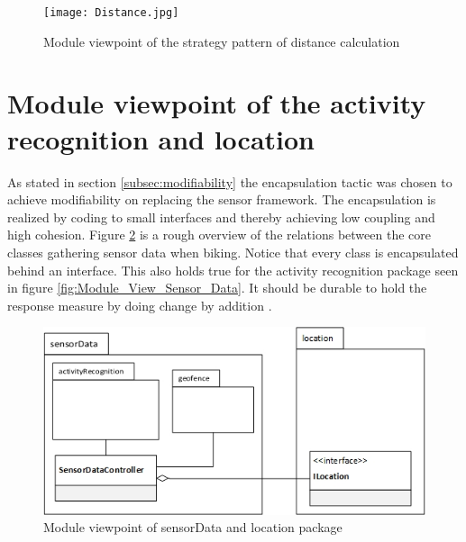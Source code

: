 \begin{figure}[H]
\centering
\texttt{[image: Distance.jpg]}
\caption{Module viewpoint of the strategy pattern of distance calculation}
\label{fig:module_view_distance_calculation}
\end{figure}

\section{Module viewpoint of the activity recognition and location}
As stated in section \ref{subsec:modifiability} the encapsulation tactic was chosen to achieve modifiability on replacing the sensor framework. The encapsulation is realized by coding to small interfaces and thereby achieving low coupling and high cohesion. Figure \ref{fig:activity_regonition_module_viewpoint} is a rough overview of the relations between the core classes gathering sensor data when biking.  
Notice that every class is encapsulated behind an interface. This also holds true for the activity recognition package seen in figure \ref{fig:Module_View_Sensor_Data}. It should be durable to hold the response measure by doing change by addition \cite{Baerbak10}.    

\begin{figure}[H]
\centering
\includegraphics[scale=0.6]{ActivityRegonitionModuleViewpoint.jpg}
\caption{Module viewpoint of sensorData and location package}
\label{fig:activity_regonition_module_viewpoint}
\end{figure}